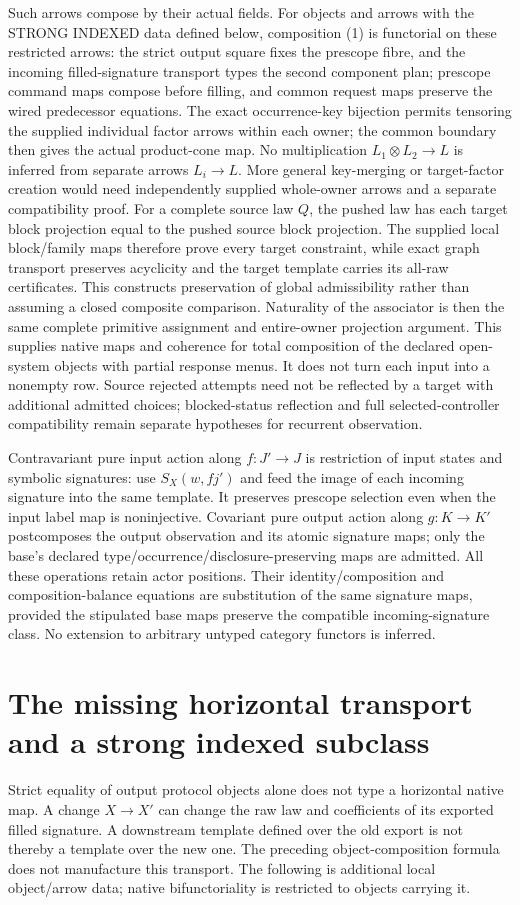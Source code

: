\documentclass[11pt]{article}\usepackage{amsmath,amssymb,amsthm,geometry}\geometry{margin=1in}
\begin{document}
Such arrows compose by their actual fields. For objects and arrows with the STRONG INDEXED data defined below, composition (1) is functorial on these restricted arrows: the strict output square fixes the prescope fibre, and the incoming filled-signature transport types the second component plan; prescope command maps compose before filling, and common request maps preserve the wired predecessor equations. The exact occurrence-key bijection permits tensoring the supplied individual factor arrows within each owner; the common boundary then gives the actual product-cone map. No multiplication $L_1\otimes L_2\to L$ is inferred from separate arrows $L_i\to L$. More general key-merging or target-factor creation would need independently supplied whole-owner arrows and a separate compatibility proof. For a complete source law $Q$, the pushed law has each target block projection equal to the pushed source block projection. The supplied local block/family maps therefore prove every target constraint, while exact graph transport preserves acyclicity and the target template carries its all-raw certificates. This constructs preservation of global admissibility rather than assuming a closed composite comparison. Naturality of the associator is then the same complete primitive assignment and entire-owner projection argument. This supplies native maps and coherence for total composition of the declared open-system objects with partial response menus. It does not turn each input into a nonempty row. Source rejected attempts need not be reflected by a target with additional admitted choices; blocked-status reflection and full selected-controller compatibility remain separate hypotheses for recurrent observation.

Contravariant pure input action along $f:J'\to J$ is restriction of input states and symbolic signatures: use $S_X(w,fj')$ and feed the image of each incoming signature into the same template. It preserves prescope selection even when the input label map is noninjective. Covariant pure output action along $g:K\to K'$ postcomposes the output observation and its atomic signature maps; only the base's declared type/occurrence/disclosure-preserving maps are admitted. All these operations retain actor positions. Their identity/composition and composition-balance equations are substitution of the same signature maps, provided the stipulated base maps preserve the compatible incoming-signature class. No extension to arbitrary untyped category functors is inferred.


\section{The missing horizontal transport and a strong indexed subclass}
Strict equality of output protocol objects alone does not type a horizontal native map. A change $X\to X'$ can change the raw law and coefficients of its exported filled signature. A downstream template defined over the old export is not thereby a template over the new one. The preceding object-composition formula does not manufacture this transport. The following is additional local object/arrow data; native bifunctoriality is restricted to objects carrying it.
\end{document}
